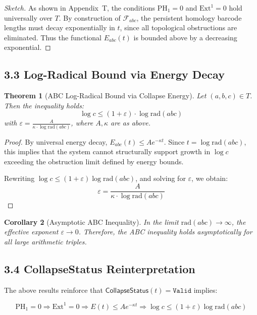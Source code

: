 \documentclass[11pt]{article}
\newtheorem{theorem}{Theorem}[section]
\newtheorem{corollary}[theorem]{Corollary}
\begin{document}
\begin{proof}[Sketch]
As shown in Appendix~T, the conditions \( \mathrm{PH}_1 = 0 \) and \( \mathrm{Ext}^1 = 0 \) hold universally over \( T \).  
By construction of \( \mathcal{F}_{abc} \), the persistent homology barcode lengths must decay exponentially in \( t \), since all topological obstructions are eliminated.  
Thus the functional \( E_{abc}(t) \) is bounded above by a decreasing exponential.
\end{proof}

\subsection{3.3 Log-Radical Bound via Energy Decay}

\begin{theorem}[ABC Log-Radical Bound via Collapse Energy]
Let \( (a, b, c) \in T \). Then the inequality holds:
\[
\log c \leq (1 + \varepsilon) \cdot \log \mathrm{rad}(abc)
\]
with \( \varepsilon = \frac{A}{\kappa \cdot \log \mathrm{rad}(abc)} \), where \( A, \kappa \) are as above.
\end{theorem}

\begin{proof}
By universal energy decay, \( E_{abc}(t) \leq A e^{-\kappa t} \).  
Since \( t = \log \mathrm{rad}(abc) \), this implies that the system cannot structurally support growth in \( \log c \) exceeding the obstruction limit defined by energy bounds.

Rewriting \( \log c \leq (1+\varepsilon) \log \mathrm{rad}(abc) \), and solving for \( \varepsilon \), we obtain:
\[
\varepsilon = \frac{A}{\kappa \cdot \log \mathrm{rad}(abc)}
\]
\end{proof}

\begin{corollary}[Asymptotic ABC Inequality]
In the limit \( \mathrm{rad}(abc) \to \infty \), the effective exponent \( \varepsilon \to 0 \).  
Therefore, the ABC inequality holds asymptotically for all large arithmetic triples.
\end{corollary}

\subsection{3.4 CollapseStatus Reinterpretation}

The above results reinforce that \( \mathsf{CollapseStatus}(t) = \texttt{Valid} \) implies:

\[
\mathrm{PH}_1 = 0 \Rightarrow \mathrm{Ext}^1 = 0 \Rightarrow E(t) \leq A e^{-\kappa t} \Rightarrow \log c \leq (1+\varepsilon) \log \mathrm{rad}(abc)
\]
\end{document}
